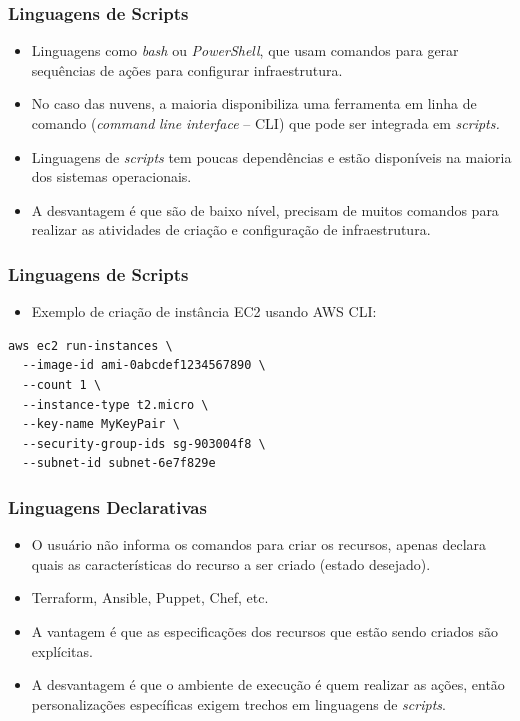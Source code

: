 \documentclass{beamer}
\begin{document}
   \begin{frame}
      \frametitle{Linguagens de Scripts}
      \begin{itemize}
      \item Linguagens como \textit{bash} ou \textit{PowerShell}, que usam comandos para gerar sequências de ações para configurar infraestrutura. 
      \item No caso das nuvens, a maioria disponibiliza uma ferramenta em linha de comando (\textit{command}\textit{ }\textit{line}\textit{ interface }– CLI) que pode ser integrada em \textit{scripts.}
      \item Linguagens de \textit{scripts} tem poucas dependências e estão disponíveis na maioria dos sistemas operacionais.
      \item A desvantagem é que são de baixo nível, precisam de muitos comandos para realizar as atividades de criação e configuração de infraestrutura.
      \end{itemize}
   \end{frame}

   \begin{frame}[fragile]
      \frametitle{Linguagens de Scripts}
      \begin{itemize}
      \item Exemplo de criação de instância EC2 usando AWS CLI:   
      \end{itemize}
      \begin{verbatim}
aws ec2 run-instances \
  --image-id ami-0abcdef1234567890 \
  --count 1 \
  --instance-type t2.micro \
  --key-name MyKeyPair \
  --security-group-ids sg-903004f8 \
  --subnet-id subnet-6e7f829e
      \end{verbatim}
   \end{frame}

   \begin{frame}
      \frametitle{Linguagens Declarativas}
      \begin{itemize}
      \item O usuário não informa os comandos para criar os recursos, apenas declara quais as características do recurso a ser criado (estado desejado).
      \item Terraform, Ansible, Puppet, Chef, etc.
      \item A vantagem é que as especificações dos recursos que estão sendo criados são explícitas.
      \item A desvantagem é que o ambiente de execução é quem realizar as ações, então personalizações específicas exigem trechos em linguagens de \textit{scripts}.
      \end{itemize}
   \end{frame}
\end{document}
